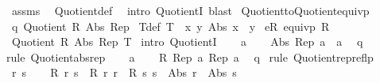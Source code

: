 \begin{isabellebody}
%
\isatagproof
{}\isamarkupfalse%
\ assms\ \isamarkupfalse%
\ Quotient{}{\isacharunderscore}{\kern0pt}def\ \isamarkupfalse%
\ {\isacharparenleft}{\kern0pt}intro\ QuotientI{\isacharparenright}{\kern0pt}\ blast{\isacharplus}{\kern0pt}%
\endisatagproof
{\isafoldproof}%
%
\isadelimproof
\isanewline
%
\endisadelimproof
\isanewline
{}\isamarkupfalse%
\ Quotient{}{\isacharunderscore}{\kern0pt}to{\isacharunderscore}{\kern0pt}Quotient{\isacharunderscore}{\kern0pt}equivp{\isacharcolon}{\kern0pt}\isanewline
{}\ q{\isacharcolon}{\kern0pt}\ {\isachardoublequoteopen}Quotient{}\ R\ Abs\ Rep{\isachardoublequoteclose}\isanewline
{}\ T{\isacharunderscore}{\kern0pt}def{\isacharcolon}{\kern0pt}\ {\isachardoublequoteopen}T\ {\isasymequiv}\ {\isasymlambda}x\ y{\isachardot}{\kern0pt}\ Abs\ x\ {\isacharequal}{\kern0pt}\ y{\isachardoublequoteclose}\isanewline
{}\ eR{\isacharcolon}{\kern0pt}\ {\isachardoublequoteopen}equivp\ R{\isachardoublequoteclose}\isanewline
{}\ {\isachardoublequoteopen}Quotient\ R\ Abs\ Rep\ T{\isachardoublequoteclose}\isanewline
%
\isadelimproof
%
\endisadelimproof
%
\isatagproof
{}\isamarkupfalse%
\ {\isacharparenleft}{\kern0pt}intro\ QuotientI{\isacharparenright}{\kern0pt}\isanewline
\ \ \isamarkupfalse%
\ a\isanewline
\ \ \isamarkupfalse%
\ {\isachardoublequoteopen}Abs\ {\isacharparenleft}{\kern0pt}Rep\ a{\isacharparenright}{\kern0pt}\ {\isacharequal}{\kern0pt}\ a{\isachardoublequoteclose}\ \isamarkupfalse%
\ q\ \isamarkupfalse%
{\isacharparenleft}{\kern0pt}rule\ Quotient{}{\isacharunderscore}{\kern0pt}abs{\isacharunderscore}{\kern0pt}rep{\isacharparenright}{\kern0pt}\isanewline
{}\isamarkupfalse%
\isanewline
\ \ \isamarkupfalse%
\ a\isanewline
\ \ \isamarkupfalse%
\ {\isachardoublequoteopen}R\ {\isacharparenleft}{\kern0pt}Rep\ a{\isacharparenright}{\kern0pt}\ {\isacharparenleft}{\kern0pt}Rep\ a{\isacharparenright}{\kern0pt}{\isachardoublequoteclose}\ \isamarkupfalse%
\ q\ \isamarkupfalse%
{\isacharparenleft}{\kern0pt}rule\ Quotient{}{\isacharunderscore}{\kern0pt}rep{\isacharunderscore}{\kern0pt}reflp{\isacharparenright}{\kern0pt}\isanewline
{}\isamarkupfalse%
\isanewline
\ \ \isamarkupfalse%
\ r\ s\isanewline
\ \ \isamarkupfalse%
\ {\isachardoublequoteopen}R\ r\ s\ {\isacharequal}{\kern0pt}\ {\isacharparenleft}{\kern0pt}R\ r\ r\ {\isasymand}\ R\ s\ s\ {\isasymand}\ Abs\ r\ {\isacharequal}{\kern0pt}\ Abs\ s{\isacharparenright}{\kern0pt}{\isachardoublequoteclose}\ \isamarkupfalse%

\end{isabellebody}
